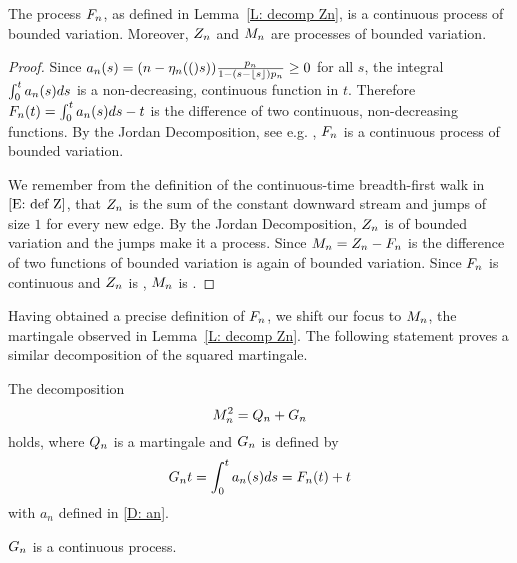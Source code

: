 \begin{corollary}
	The process $F_n$, as defined in Lemma~\ref{L: decomp Zn}, is a continuous process of bounded variation.
	Moreover, $Z_n$ and $M_n$ are \cadlag processes of bounded variation.
\end{corollary}

\begin{proof}
	Since $a_n(s) = (n - \eta_n(()s)) \frac{p_n}{1-(s-\lfloor s\rfloor)p_n} \geq 0$ for all $s$,
	the integral $\int_{0}^{t}a_n(s)ds$ is a non-decreasing, continuous function in $t$.
	Therefore $F_n(t) = \int_{0}^{t}a_n(s)ds -t$ is the difference of two continuous, non-decreasing functions.
	By the Jordan Decomposition, see e.g. \cite{Mikosch.2009}, $F_n$ is a continuous process of bounded variation.
	
	We remember from the definition of the continuous-time breadth-first walk in $\eqref{E: def Z}$,
	that $Z_n$ is the sum of the constant downward stream and jumps of size $1$ for every new edge.
	By the Jordan Decomposition, $Z_n$ is of bounded variation and the jumps make it a \cadlag process.
	Since $M_n = Z_n - F_n$ is the difference of two functions of bounded variation is again of bounded variation.
	Since $F_n$ is continuous and $Z_n$ is \cadlag, $M_n$ is \cadlag.
\end{proof}



Having obtained a precise definition of $F_n$, we shift our focus to $M_n$, the martingale observed in Lemma~\ref{L: decomp Zn}.
The following statement proves a similar decomposition of the squared martingale.

\begin{lemma} \label{L: decomp Mn}
	The decomposition
	\begin{equation} \label{E: decomp Mn}
	M_n^2 = Q_n + G_n
	\end{equation}
	holds, where $Q_n$ is a martingale and $G_n$ is defined by 
	\begin{equation} \label{D: Bn}
	G_n{t} = \int_{0}^{t} a_n(s)ds = F_n(t) + t
	\end{equation}
	with $a_n$ defined in \eqref{D: an}.
\end{lemma}
\begin{note} \label{N: decomp Mn}
	$G_n$ is a continuous process.
\end{note}

